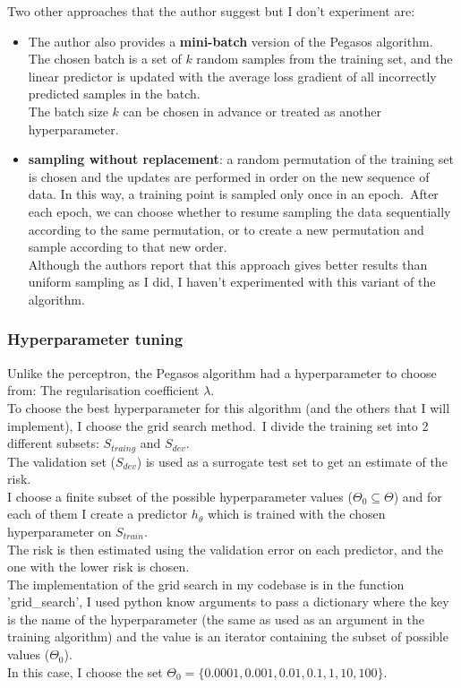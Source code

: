 Two other approaches that the author suggest but I don't experiment are:
\begin{itemize}
    \item The author also provides a \textbf{mini-batch} version of the Pegasos algorithm.\\ 
    The chosen batch is a set of $k$ random samples from the training set, and the linear predictor is updated with the average loss gradient of all incorrectly predicted samples in the batch.\\
    The batch size $k$ can be chosen in advance or treated as another hyperparameter.\\
    \item \textbf{sampling without replacement}: a random permutation of the training set is chosen and the updates are performed in order on the new sequence of data.
    In this way, a training point is sampled only once in an epoch.\
    After each epoch, we can choose whether to resume sampling the data sequentially according to the same permutation, or to create a new permutation and sample according to that new order.\\
    Although the authors report that this approach gives better results than uniform sampling as I did, I haven't experimented with this variant of the algorithm.\\    
\end{itemize} 

\subsubsection{Hyperparameter tuning} \label{sub:hyptun}
Unlike the perceptron, the Pegasos algorithm had a hyperparameter to choose from: The regularisation coefficient $\lambda$.\\
To choose the best hyperparameter for this algorithm (and the others that I will implement), I choose the grid search method.\
I divide the training set into 2 different subsets: $S_{traing}$ and $S_{dev}$.\\
The validation set ($S_{dev}$) is used as a surrogate test set to get an estimate of the risk.\\
I choose a finite subset of the possible hyperparameter values ($\Theta_0 \subseteq \Theta$) and for each of them I create a predictor $h_\theta$ which is trained with the chosen hyperparameter on $S_{train}$.\\
The risk is then estimated using the validation error on each predictor, and the one with the lower risk is chosen.\\
The implementation of the grid search in my codebase is in the function 'grid\_search', I used python know arguments to pass a dictionary where the key is the name of the hyperparameter (the same as used as an argument in the training algorithm) and the value is an iterator containing the subset of possible values ($\Theta_0$).\\ 
In this case, I choose the set $\Theta_0 = \{ 0.0001, 0.001, 0.01, 0.1, 1, 10, 100 \}$.\\

